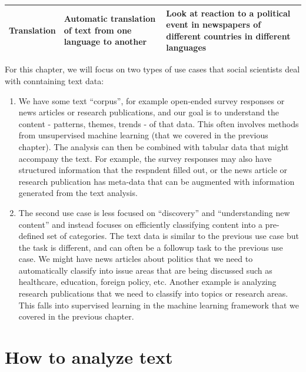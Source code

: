 \documentclass[]{krantz}
\begin{document}
\begin{longtable}[]{@{}lll@{}}
\begin{minipage}[t]{0.12\columnwidth}\raggedright\strut
Translation\strut
\end{minipage} & \begin{minipage}[t]{0.16\columnwidth}\raggedright\strut
Automatic translation of text from one language to another\strut
\end{minipage} & \begin{minipage}[t]{0.63\columnwidth}\raggedright\strut
Look at reaction to a political event in newspapers of different
countries in different languages\strut
\end{minipage}\tabularnewline
\bottomrule
\end{longtable}

For this chapter, we will focus on two types of use cases that social
scientists deal with conntaining text data:

\begin{enumerate}
\def\labelenumi{\arabic{enumi}.}
\item
  We have some text ``corpus'', for example open-ended survey responses
  or news articles or research publications, and our goal is to
  understand the content - patterns, themes, trends - of that data. This
  often involves methods from unsupervised machine learning (that we
  covered in the previous chapter). The analysis can then be combined
  with tabular data that might accompany the text. For example, the
  survey responses may also have structured information that the
  respndent filled out, or the news article or research publication has
  meta-data that can be augmented with information generated from the
  text analysis.
\item
  The second use case is less focused on ``discovery'' and
  ``understanding new content'' and instead focuses on efficiently
  classifying content into a pre-defined set of categories. The text
  data is similar to the previous use case but the task is different,
  and can often be a followup task to the previous use case. We might
  have news articles about politics that we need to automatically
  classify into issue areas that are being discussed such as healthcare,
  education, foreign policy, etc. Another example is analyzing research
  publications that we need to classify into topics or research areas.
  This falls into supervised learning in the machine learning framework
  that we covered in the previous chapter.
\end{enumerate}

\section{How to analyze text}\label{how-to-analyze-text}
\end{document}
